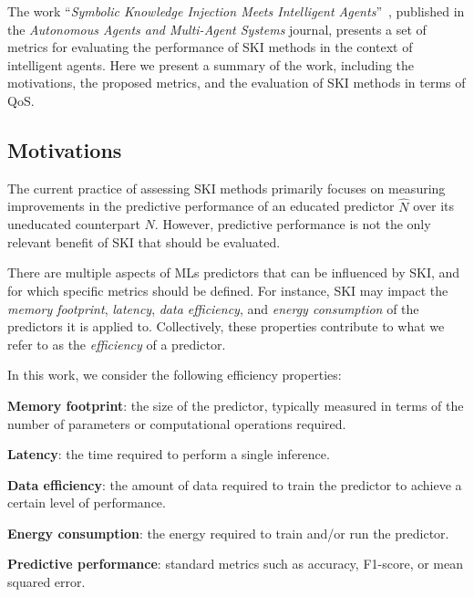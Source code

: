 The work ``\emph{Symbolic Knowledge Injection Meets Intelligent Agents}''~\cite{DBLP:journals/aamas/AgiolloRMCO23}, published in the \emph{Autonomous Agents and Multi-Agent Systems} journal, presents a set of metrics for evaluating the performance of \gls{SKI} methods in the context of intelligent agents.
%
Here we present a summary of the work, including the motivations, the proposed metrics, and the evaluation of \gls{SKI} methods in terms of \gls{QoS}.


\subsection{Motivations}\label{subsec:ski-meets-intelligent-agents-motivations}
%
The current practice of assessing \gls{SKI} methods primarily focuses on measuring improvements in the predictive performance of an educated predictor \(\hat{N}\) over its uneducated counterpart \(N\).
%
However, predictive performance is not the only relevant benefit of \gls{SKI} that should be evaluated.

There are multiple aspects of \glspl{ML} predictors that can be influenced by \gls{SKI}, and for which specific metrics should be defined.
%
For instance, \gls{SKI} may impact the \emph{memory footprint}, \emph{latency}, \emph{data efficiency}, and \emph{energy consumption} of the predictors it is applied to.
%
Collectively, these properties contribute to what we refer to as the \emph{efficiency} of a predictor.

In this work, we consider the following efficiency properties:
%
\begin{properties}
    \item \textbf{Memory footprint}: the size of the predictor, typically measured in terms of the number of parameters or computational operations required.
    \label{itm:memory-footprint}
    \item \textbf{Latency}: the time required to perform a single inference.
    \label{itm:latency}
    \item \textbf{Data efficiency}: the amount of data required to train the predictor to achieve a certain level of performance.
    \label{itm:data-efficiency}
    \item \textbf{Energy consumption}: the energy required to train and/or run the predictor.
    \label{itm:energy-consumption}
    \item \textbf{Predictive performance}: standard metrics such as accuracy, F1-score, or mean squared error.
    \label{itm:predictive-performance}
\end{properties}

